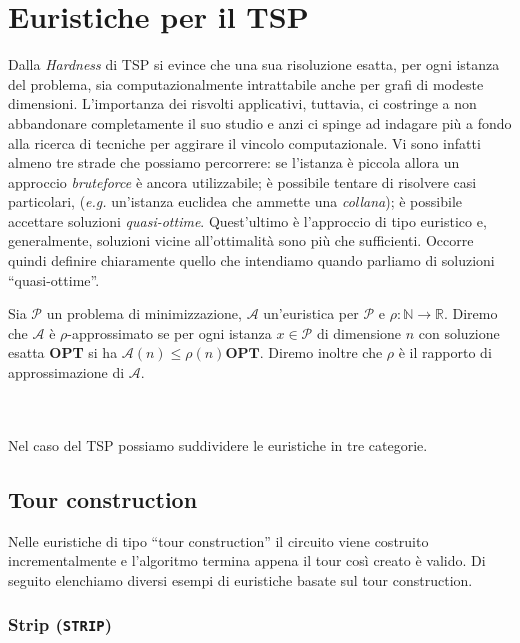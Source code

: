 \chapter{Euristiche per il TSP}

Dalla \textit{Hardness} di TSP si evince che una sua risoluzione esatta, per ogni istanza del problema,
sia computazionalmente intrattabile anche per grafi di modeste dimensioni. L'importanza dei risvolti 
applicativi, tuttavia, ci costringe a non abbandonare completamente il suo studio e anzi ci spinge
ad indagare più a fondo alla ricerca di tecniche per aggirare il vincolo computazionale. Vi sono infatti
almeno tre strade che possiamo percorrere: se l'istanza è piccola allora un approccio \textit{bruteforce}
è ancora utilizzabile; è possibile tentare di risolvere casi particolari, (\textit{e.g.} un'istanza 
euclidea che ammette una \textit{collana}\cite{Neck}); è possibile accettare soluzioni \textit{quasi-ottime}. 
Quest'ultimo è l'approccio di tipo euristico e, generalmente, soluzioni vicine all'ottimalità sono più che sufficienti. 
Occorre quindi definire chiaramente quello che intendiamo quando parliamo di soluzioni ``quasi-ottime''.

\begin{definition}
    Sia $\mathcal{P}$ un problema di minimizzazione, $\mathcal{A}$ un'euristica per
    $\mathcal{P}$ e $\rho{}:\mathbb{N}\rightarrow{}\mathbb{R}$. Diremo che
    $\mathcal{A}$ è $\rho$-approssimato se per ogni istanza $x \in \mathcal{P}$ di dimensione $n$ con soluzione
    esatta \textbf{OPT} si ha $\mathcal{A}(n) \leq \rho{}(n)\textbf{OPT}$. Diremo inoltre che $\rho$
    è il rapporto di approssimazione di $\mathcal{A}$.

\end{definition}
\ \\
\ \\
Nel caso del TSP possiamo suddividere le euristiche in tre categorie.

\section{Tour construction}

Nelle euristiche di tipo ``tour construction'' il circuito viene costruito incrementalmente e l'algoritmo
termina appena il tour così creato è valido. Di seguito elenchiamo diversi esempi di euristiche basate
sul tour construction.
\ \\

\subsection{Strip (\texttt{STRIP})}

